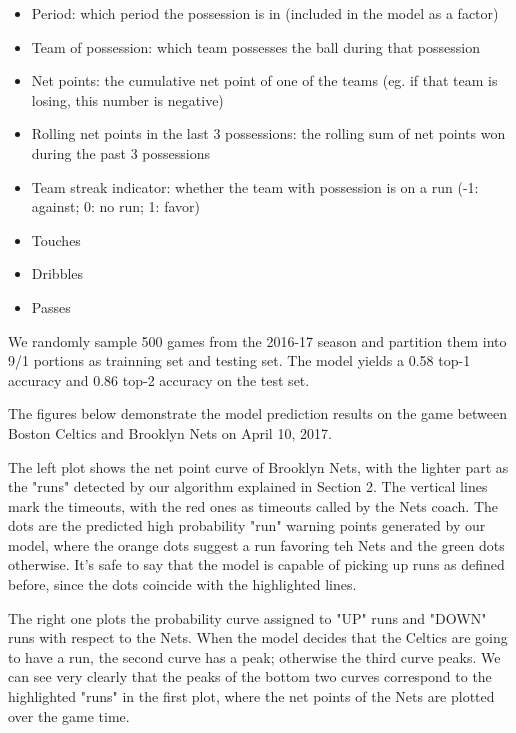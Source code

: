 \documentclass{article}
\begin{document}
\begin{itemize}
   \item  Period: which period the possession is in (included in the model as a factor)
   \item  Team of possession: which team possesses the ball during that possession
   \item  Net points: the cumulative net point of one of the teams (eg. if that team is losing, this number is negative)
   \item  Rolling net points in the last 3 possessions: the rolling sum of net points won during the past 3 possessions
   \item  Team streak indicator: whether the team with possession is on a run (-1: against; 0: no run; 1: favor)
   \item  Touches
   \item  Dribbles
   \item  Passes
\end{itemize}

We randomly sample 500 games from the 2016-17 season and partition them into 9/1 portions as trainning set and testing set. The model yields a 0.58 top-1 accuracy and 0.86 top-2 accuracy on the test set.\newline

The figures below demonstrate the model prediction results on the game between Boston Celtics and Brooklyn Nets on April 10, 2017. \newline

The left plot shows the net point curve of Brooklyn Nets, with the lighter part as the "runs" detected by our algorithm explained in Section 2. The vertical lines mark the timeouts, with the red ones as timeouts called by the Nets coach. The dots are the predicted high probability "run" warning points generated by our model, where the orange dots suggest a run favoring teh Nets and the green dots otherwise. It's safe to say that the model is capable of picking up runs as defined before, since the dots coincide with the highlighted lines. \newline

The right one plots the probability curve assigned to "UP" runs and "DOWN" runs with respect to the Nets. When the model decides that the Celtics are going to have a run, the second curve has a peak; otherwise the third curve peaks. We can see very clearly that the peaks of the bottom two curves correspond to the highlighted "runs" in the first plot, where the net points of the Nets are plotted over the game time.\newline
\end{document}
